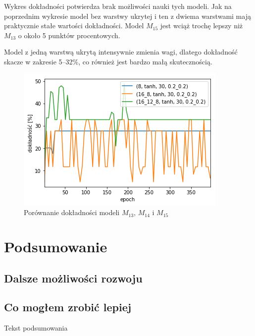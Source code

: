 \documentclass{report}
\begin{document}
    Wykres dokładności potwierdza brak możliwości nauki tych modeli.
    Jak na poprzednim wykresie model bez warstwy ukrytej i ten z dwiema warstwami mają praktycznie stałe wartości dokładności.
    Model $M_{15}$ jest wciąż trochę lepszy niż $M_{13}$ o około 5 punktów procentowych.

    Model z jedną warstwą ukrytą intensywnie zmienia wagi, dlatego dokładność skacze w zakresie 5--32\%, co również jest bardzo małą skutecznością.

    \begin{figure}[htp]
        \centering
        \includegraphics[scale=0.8]{././img/arch-accuracy-tanh.png}
        \caption{Porównanie dokładności modeli $M_{13}$, $M_{14}$ i $M_{15}$}
    \end{figure}

    \chapter{Podsumowanie}\label{ch:podsumowanie}

    \section{Dalsze możliwości rozwoju}\label{sec:dalszeMozliwosciRozwoju}

    \section{Co mogłem zrobić lepiej}\label{sec:coMoglemZrobicLepiej}

    Tekst podsumowania

    
    

    \listoffigures
    \listoftables
\end{document}
